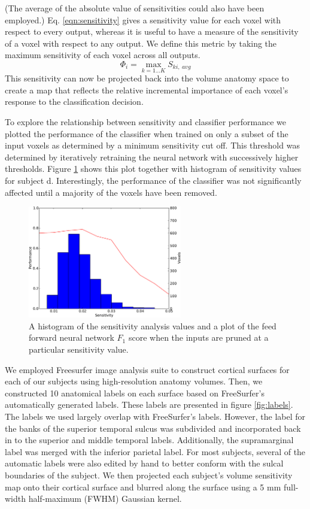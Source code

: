 \documentclass[authoryear]{elsarticle}
\begin{document}
(The average of the absolute value of sensitivities could also have been employed.)
Eq. \ref{eqn:sensitivity} gives a sensitivity value for each voxel with respect to every output, whereas it is useful to have a measure of the sensitivity of a voxel with respect to any output.
We define this metric by taking the maximum sensitivity of each voxel across all outputs.
\begin{equation}
\Phi_{i} = \max_{k=1 \dots K}{S_{ki,~avg}}
\end{equation}
This sensitivity can now be projected back into the volume anatomy space to create a  map that reflects the relative incremental importance of each voxel's response to the classification decision.

To  explore the relationship between sensitivity and classifier performance we plotted the performance of the classifier when trained on only a subset of the input voxels as determined by a minimum sensitivity cut off.
This threshold was determined by iteratively retraining the neural network with successively higher thresholds.
Figure \ref{fig:sensitivity-cutoff} shows this plot together with histogram of sensitivity values for subject d.
Interestingly, the performance of the classifier was not significantly affected until a majority of the voxels have been removed.

\begin{figure}
\centering
\includegraphics[width=0.6\textwidth]{figures/performance-verse-sensitivity-cutoff}
\caption{A histogram of the sensitivity analysis values and a plot of the feed forward neural network $F_1$ score when the inputs are pruned at a particular sensitivity value. }
\label{fig:sensitivity-cutoff}
\end{figure}

We employed Freesurfer image analysis suite to construct cortical surfaces for each of our subjects using high-resolution anatomy volumes.
Then, we constructed 10 anatomical labels on each surface based on FreeSurfer's automatically generated labels.
These labels are presented in figure \ref{fig:labels}.
The labels we used largely overlap with FreeSurfer's labels.
However, the label for the banks of the superior temporal sulcus was subdivided and incorporated back in to the superior and middle temporal labels.
Additionally, the supramarginal label was merged with the inferior parietal label.
For most subjects, several of the automatic labels were also edited by hand to better conform with the sulcal boundaries of the subject.
We then projected each subject's volume sensitivity map onto their cortical surface and blurred along the surface using a 5 mm full-width half-maximum (FWHM) Gaussian kernel.
\end{document}

